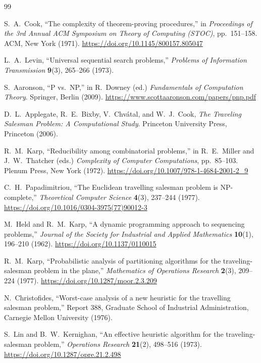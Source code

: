 \documentclass[11pt,a4paper]{article}
\begin{document}
\begin{thebibliography}{99}\small

S.~A.~Cook, ``The complexity of theorem-proving procedures,''
in \emph{Proceedings of the 3rd Annual ACM Symposium on Theory of
Computing (STOC)}, pp.~151--158. ACM, New York (1971).
\url{https://doi.org/10.1145/800157.805047}

L.~A.~Levin, ``Universal sequential search problems,''
\emph{Problems of Information Transmission} \textbf{9}(3), 265--266 (1973).

S.~Aaronson, ``P vs.\ NP,''
in R.~Downey (ed.) \emph{Fundamentals of Computation Theory}.
Springer, Berlin (2009).
\url{https://www.scottaaronson.com/papers/pnp.pdf}

D.~L.~Applegate, R.~E.~Bixby, V.~Chv\'atal, and W.~J.~Cook,
\emph{The Traveling Salesman Problem: A Computational Study}.
Princeton University Press, Princeton (2006).

R.~M.~Karp, ``Reducibility among combinatorial problems,''
in R.~E.~Miller and J.~W.~Thatcher (eds.) \emph{Complexity of Computer
Computations}, pp.~85--103. Plenum Press, New York (1972).
\url{https://doi.org/10.1007/978-1-4684-2001-2_9}

C.~H.~Papadimitriou, ``The Euclidean travelling salesman problem is
NP-complete,''
\emph{Theoretical Computer Science} \textbf{4}(3), 237--244 (1977).
\url{https://doi.org/10.1016/0304-3975(77)90012-3}

M.~Held and R.~M.~Karp, ``A dynamic programming approach to
sequencing problems,''
\emph{Journal of the Society for Industrial and Applied Mathematics}
\textbf{10}(1), 196--210 (1962).
\url{https://doi.org/10.1137/0110015}

R.~M.~Karp, ``Probabilistic analysis of partitioning algorithms for
the traveling-salesman problem in the plane,''
\emph{Mathematics of Operations Research} \textbf{2}(3), 209--224 (1977).
\url{https://doi.org/10.1287/moor.2.3.209}

N.~Christofides, ``Worst-case analysis of a new heuristic for the
travelling salesman problem,''
Report 388, Graduate School of Industrial Administration,
Carnegie Mellon University (1976).

S.~Lin and B.~W.~Kernighan, ``An effective heuristic algorithm for
the traveling-salesman problem,''
\emph{Operations Research} \textbf{21}(2), 498--516 (1973).
\url{https://doi.org/10.1287/opre.21.2.498}


\end{thebibliography}
\end{document}

